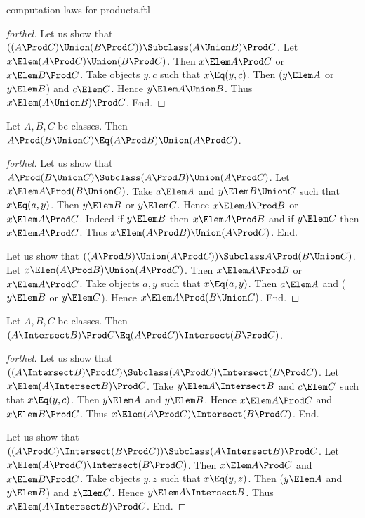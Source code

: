 \documentclass{stex}
\begin{document}
\begin{smodule}{computation-laws-for-products.ftl}
\begin{proof}[forthel]
  Let us show that $((A \Prod C) \Union (B \Prod C)) \Subclass (A \Union B) \Prod C$. %
    Let $x \Elem (A \Prod C) \Union (B \Prod C)$.
    Then $x \Elem A \Prod C$ or $x \Elem B \Prod C$.
    Take objects $y, c$ such that $x \Eq (y, c)$.
    Then ($y \Elem A$ or $y \Elem B$) and $c \Elem C$.
    Hence $y \Elem A \Union B$.
    Thus $x \Elem (A \Union B) \Prod C$.
  End.
\end{proof}

\begin{proposition*}[forthel]
  Let $A, B, C$ be classes.
  Then $A \Prod (B \Union C) \Eq (A \Prod B) \Union (A \Prod C)$.
\end{proposition*}
\begin{proof}[forthel]
  Let us show that $A \Prod (B \Union C) \Subclass (A \Prod B) \Union (A \Prod C)$.
    Let $x \Elem A \Prod (B \Union C)$.
    Take $a \Elem A$ and $y \Elem B \Union C$ such that $x \Eq (a, y)$.
    Then $y \Elem B$ or $y \Elem C$.
    Hence $x \Elem A \Prod B$ or $x \Elem A \Prod C$.
    Indeed if $y \Elem B$ then $x \Elem A \Prod B$ and if $y \Elem C$ then $x \Elem A \Prod C$.
    Thus $x \Elem (A \Prod B) \Union (A \Prod C)$.
  End.

  Let us show that $((A \Prod B) \Union (A \Prod C)) \Subclass A \Prod (B \Union C)$.
    Let $x \Elem (A \Prod B) \Union (A \Prod C)$.
    Then $x \Elem A \Prod B$ or $x \Elem A \Prod C$.
    Take objects $a, y$ such that $x \Eq (a, y)$.
    Then $a \Elem A$ and ($y \Elem B$ or $y \Elem C$).
    Hence $x \Elem A \Prod (B \Union C)$.
  End.
\end{proof}

\begin{proposition*}[forthel]
  Let $A, B, C$ be classes.
  Then $(A \Intersect B) \Prod C \Eq (A \Prod C) \Intersect (B \Prod C)$.
\end{proposition*}
\begin{proof}[forthel]
  Let us show that $((A \Intersect B) \Prod C) \Subclass (A \Prod C) \Intersect (B \Prod C)$. %
    Let $x \Elem (A \Intersect B) \Prod C$.
    Take $y \Elem A \Intersect B$ and $c \Elem C$ such that $x \Eq (y, c)$.
    Then $y \Elem A$ and $y \Elem B$.
    Hence $x \Elem A \Prod C$ and $x \Elem B \Prod C$.
    Thus $x \Elem (A \Prod C) \Intersect (B \Prod C)$.
  End.

  Let us show that $((A \Prod C) \Intersect (B \Prod C)) \Subclass (A \Intersect B) \Prod C$. %
    Let $x \Elem (A \Prod C) \Intersect (B \Prod C)$.
    Then $x \Elem A \Prod C$ and $x \Elem B \Prod C$.
    Take objects $y, z$ such that $x \Eq (y, z)$.
    Then ($y \Elem A$ and $y \Elem B$) and $z \Elem C$.
    Hence $y \Elem A \Intersect B$.
    Thus $x \Elem (A \Intersect B) \Prod C$.
  End.
\end{proof}


\end{smodule}
\end{document}
